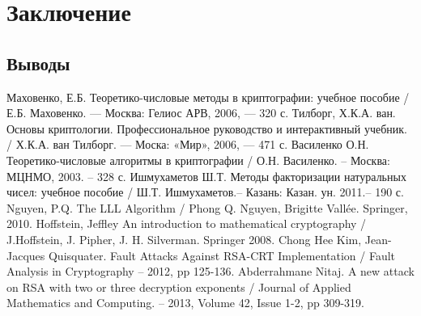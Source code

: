 \newpage
\chapter{Заключение}

\section{Выводы}

\newpage
\begin{thebibliography}{@@@@}	
		Маховенко, Е.Б. Теоретико-числовые методы в криптографии: учебное пособие / Е.Б. Маховенко. — Москва: Гелиос АРВ, 2006, — 320 с.
		Тилборг, Х.К.А. ван. Основы криптологии. Профессиональное руководство и интерактивный учебник. / Х.К.А. ван Тилборг. — Моска: «Мир», 2006,
		— 471 с.
		Василенко О.Н. Теоретико-числовые алгоритмы в криптографии / О.Н. Василенко. – Москва: МЦНМО, 2003. – 328 с.
		Ишмухаметов Ш.Т. Методы факторизации натуральных чисел: учебное пособие / Ш.Т. Ишмухаметов.– Казань: Казан. ун. 2011.– 190 с.
		Nguyen, P.Q. The LLL Algorithm / Phong Q. Nguyen, Brigitte Vallée. Springer, 2010.
		Hoffstein, Jeffley An introduction to mathematical cryptography / J.Hoffstein, J. Pipher, J. H. Silverman. Springer 2008.
		Chong Hee Kim, Jean-Jacques Quisquater. Fault Attacks Against RSA-CRT Implementation / Fault Analysis in Cryptography – 2012, pp 125-136.
		Abderrahmane Nitaj. A new attack on RSA with two or three decryption exponents / Journal of Applied Mathematics and Computing. –
		2013, Volume 42, Issue 1-2, pp 309-319.	
	\end{thebibliography}